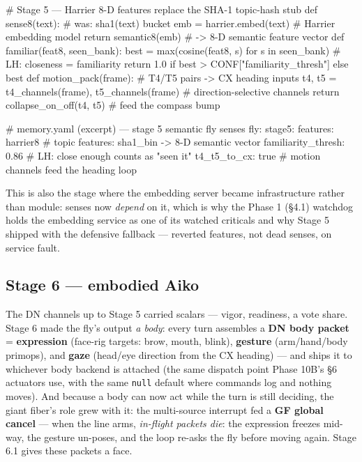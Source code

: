 \documentclass[11pt]{article}
\begin{document}
\begin{CodeBlock}
# Stage 5 — Harrier 8-D features replace the SHA-1 topic-hash stub
def sense8(text):                                    # was: sha1(text) bucket
    emb = harrier.embed(text)                        # Harrier embedding model
    return semantic8(emb)                             # -> 8-D semantic feature vector
def familiar(feat8, seen_bank):
    best = max(cosine(feat8, s) for s in seen_bank)  # LH: closeness = familiarity
    return 1.0 if best > CONF["familiarity_thresh"] else best
def motion_pack(frame):                              # T4/T5 pairs -> CX heading inputs
    t4, t5 = t4_channels(frame), t5_channels(frame)  # direction-selective channels
    return collapse_on_off(t4, t5)                   # feed the compass bump
\end{CodeBlock}

\begin{CodeBlock}
# memory.yaml (excerpt) — stage 5 semantic fly senses
fly:
  stage5:
    features: harrier8               # topic features: sha1_bin -> 8-D semantic vector
    familiarity_thresh: 0.86         # LH: close enough counts as "seen it"
    t4_t5_to_cx: true                # motion channels feed the heading loop
\end{CodeBlock}

This is also the stage where the embedding server became infrastructure rather than module: senses now \emph{depend} on it, which is why the Phase 1 (§4.1) watchdog holds the embedding service as one of its watched criticals and why Stage 5 shipped with the defensive fallback — reverted features, not dead senses, on service fault.

\subsection{Stage 6 — embodied Aiko}

The DN channels up to Stage 5 carried scalars — vigor, readiness, a vote share. Stage 6 made the fly's output \emph{a body}: every turn assembles a \textbf{DN body packet} = \textbf{expression} (face-rig targets: brow, mouth, blink), \textbf{gesture} (arm/hand/body primops), and \textbf{gaze} (head/eye direction from the CX heading) — and ships it to whichever body backend is attached (the same dispatch point Phase 10B's §6 actuators use, with the same \texttt{null} default where commands log and nothing moves). And because a body can now act while the turn is still deciding, the giant fiber's role grew with it: the multi-source interrupt fed a \textbf{GF global cancel} — when the line arms, \emph{in-flight packets die}: the expression freezes mid-way, the gesture un-poses, and the loop re-asks the fly before moving again. Stage 6.1 gives these packets a face.
\end{document}
